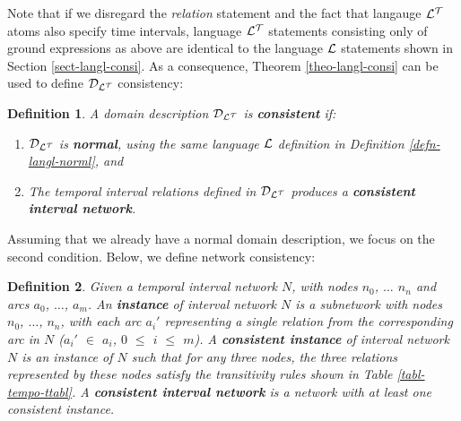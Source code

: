 \documentclass[11pt]{report}
\newtheorem{vdefinition}{Definition}[chapter]
\begin{document}
      Note that if we disregard the {\em relation} statement and the fact
      that langauge ${\cal L^T}$ atoms also specify time intervals, language
      ${\cal L^T}$ statements consisting only of ground expressions as above
      are identical to the language ${\cal L}$ statements shown in Section
      \ref{sect-langl-consi}. As a consequence, Theorem \ref{theo-langl-consi}
      can be used to define ${\cal D_{L^T}}$ consistency:

      \begin{vdefinition}
        \label{defn-tempo-cons1}
        A domain description ${\cal D_{L^T}}$ is {\bf consistent} if:

        \begin{enumerate}
          \item
            \label{defn-tempo-cons1-1}
            ${\cal D_{L^T}}$ is {\bf normal}, using the same language
            ${\cal L}$ definition in Definition \ref{defn-langl-norml}, and

          \item
            \label{defn-tempo-cons1-2}
            The temporal interval relations defined in ${\cal D_{L^T}}$
            produces a {\bf consistent interval network}.
        \end{enumerate}
      \end{vdefinition}

      Assuming that we already have a normal domain description, we focus on
      the second condition. Below, we define network consistency:

      \begin{vdefinition}
        \label{defn-tempo-cons2}
        Given a temporal interval network $N$, with nodes $n_0$,
        $\ldots$ $n_n$ and arcs $a_0$, $\ldots$, $a_m$. An {\bf instance} of
        interval network $N$ is a subnetwork with nodes $n_0$, $\ldots$, $n_n$,
        with each arc $a_{i}'$ representing a single relation from the
        corresponding arc in $N$ ($a_{i}'$ $\in$ $a_i$, $0$ $\leq$ $i$ $\leq$
        $m$). A {\bf consistent instance} of interval network $N$ is an
        instance of $N$ such that for any three nodes, the three relations
        represented by these nodes satisfy the transitivity rules shown in
        Table \ref{tabl-tempo-ttabl}. A {\bf consistent interval network} is a
        network with at least one consistent instance.
      \end{vdefinition}
\end{document}
